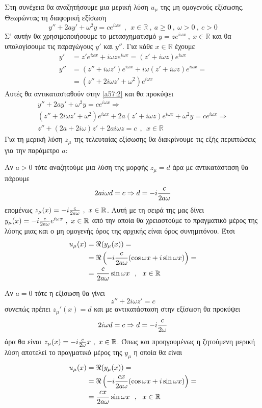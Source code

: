 \documentclass[a4paper,twoside,11pt]{book}
\DeclareRobustCommand{\frac}[3][0pt]{%
{\begingroup\hspace{#1}#2\hspace{#1}\endgroup\over\hspace{#1}#3\hspace{#1}}}
\begin{document}
Στη συνέχεια θα αναζητήσουμε μια μερική λύση $ u_\mu $ της μη ομογενούς εξίσωσης. Θεωρώντας τη διαφορική εξίσωση
\begin{equation}\label{a57:2}
y''+2ay'+\omega^2y=ce^{i\omega x}\ \ ,\ \ x\in\mathbb{R}\ ,\ a\geq 0\ ,\ \omega>0\ ,\ c>0
\end{equation}
Σ' αυτήν θα χρησιμοποιήσουμε το μετασχηματισμό $ y=ze^{i\omega x}\ ,\ x\in\mathbb{R} $ και θα υπολογίσουμε τις παραγώγους $ y' $ και $ y'' $. Για κάθε $ x\in\mathbb{R} $ έχουμε
\begin{align*}
y'&=z'e^{i\omega x}+i\omega ze^{i\omega x}=(z'+i\omega z)e^{i\omega x}\\
y''&=(z''+i\omega z')e^{i\omega x}+i\omega (z'+i\omega z)e^{i\omega x}=\\&=\left(z''+2i\omega z'+\omega^2\right)e^{i\omega x} 
\end{align*}
Αυτές θα αντικατασταθούν στην \eqref{a57:2} και θα προκύψει
\begin{gather*}
y''+2ay'+\omega^2y=ce^{i\omega x}\Rightarrow\\
\left(z''+2i\omega z'+\omega^2\right)e^{i\omega x}+2a(z'+i\omega z)e^{i\omega x}+\omega^2 y=ce^{i\omega x}\Rightarrow\\
z''+(2a+2i\omega)z'+2ai\omega z=c\ \ ,\ \ x\in\mathbb{R}
\end{gather*}
Για τη μερική λύση $ z_\mu $ της τελευταίας εξίσωσης θα διακρίνουμε τις εξής περιπτώσεις για την παράμετρο $ a $:
\begin{rlist}
\item Αν $ a>0 $ τότε αναζητούμε μια λύση της μορφής $ z_\mu=d $ άρα με αντικατάσταση θα πάρουμε
\[ 2ai\omega d=c\Rightarrow d=-i\frac{c}{2a\omega} \]
επομένως $ z_\mu(x)=-i\frac{c}{2a\omega}\ ,\ x\in\mathbb{R} $. Αυτή με τη σειρά της μας δίνει $ y_\mu(x)=-i\frac{c}{2a\omega}e^{i\omega x}\ ,\ x\in\mathbb{R} $ από την οποία θα χρειαστούμε το πραγματικό μέρος της λύσης μιας και ο μη ομογενής όρος της αρχικής είναι όρος συνημιτόνου. Έτσι
\begin{align*}
u_\mu(x)&=\Re(y_\mu(x))=\\&=\Re\left(-i\frac{c}{2a\omega}(\cos{\omega x}+i\sin{\omega x})\right)=\\&=\frac{c}{2a\omega}\sin{\omega x}\ \ ,\ \ x\in\mathbb{R} 
\end{align*}
\item Αν $ a=0 $ τότε η εξίσωση θα γίνει
\[ z''+2i\omega z'=c \]
συνεπώς πρέπει $ z_\mu'(x)=d $ και με αντικατάσταση στην εξίσωση θα προκύψει
\[ 2i\omega d=c\Rightarrow d=-i\frac{c}{2\omega} \]
άρα θα είναι $ z_\mu(x)=-i\frac{c}{2\omega}x\ ,\ x\in\mathbb{R} $. Όπως και προηγουμένως η ζητούμενη μερική λύση αποτελεί το πραγματικό μέρος της $ y_\mu $ η οποία θα είναι
\begin{align*}
u_\mu(x)&=\Re(y_\mu(x))=\\&=\Re\left(-i\frac{cx}{2a\omega}(\cos{\omega x}+i\sin{\omega x})\right)=\\&=\frac{cx}{2a\omega}\sin{\omega x}\ \ ,\ \ x\in\mathbb{R} 
\end{align*}
\end{rlist}
\end{document}
